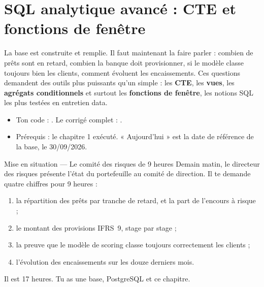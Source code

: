 \chapter{SQL analytique avancé : CTE et fonctions de fenêtre}


La base est construite et remplie. Il faut maintenant la faire parler : combien de prêts sont en
retard, combien la banque doit provisionner, si le modèle classe toujours bien les clients, comment
évoluent les encaissements. Ces questions demandent des outils plus puissants qu'un simple
 : les \textbf{CTE}, les \textbf{vues}, les \textbf{agrégats conditionnels} et surtout
les \textbf{fonctions de fenêtre}, les notions SQL les plus testées en entretien data.

\begin{observation}
\begin{itemize}
\item Ton code : . Le corrigé complet : .
\item Prérequis : le chapitre 1 exécuté. « Aujourd'hui » est la date de référence de la base, le 30/09/2026.
\end{itemize}
\end{observation}

\begin{situation}{Mise en situation --- Le comité des risques de 9 heures}
Demain matin, le directeur des risques présente l'état du portefeuille au comité de direction. Il te
demande quatre chiffres pour 9 heures :
\begin{enumerate}
\item la répartition des prêts par tranche de retard, et la part de l'encours à risque ;
\item le montant des provisions IFRS~9, stage par stage ;
\item la preuve que le modèle de scoring classe toujours correctement les clients ;
\item l'évolution des encaissements sur les douze derniers mois.
\end{enumerate}
Il est 17 heures. Tu as une base, PostgreSQL et ce chapitre.
\end{situation}

